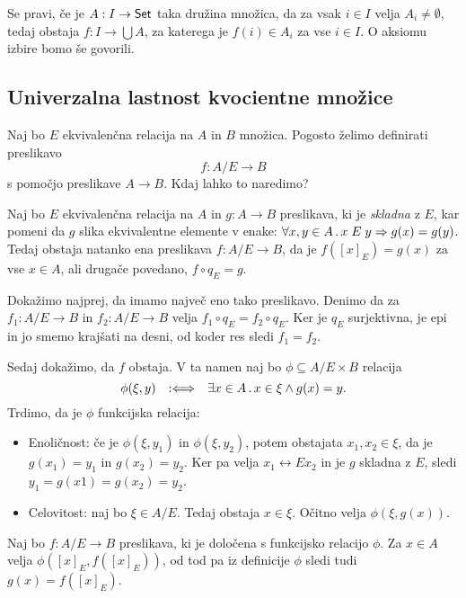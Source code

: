 Se pravi, če je $A : I \to \mathsf{Set}$ taka družina množica, da za vsak $i \in I$ velja $A_i \neq \emptyset$,
tedaj obstaja $f : I \to \bigcup A$, za katerega je $f(i) \in A_i$ za vse $i \in I$.
%
O aksiomu izbire bomo še govorili.


\subsection{Univerzalna lastnost kvocientne množice}

Naj bo $E$ ekvivalenčna relacija na $A$ in $B$ množica. Pogosto želimo definirati
preslikavo
%
\begin{equation*}
    f : A/E \to B
\end{equation*}
%
s pomočjo preslikave $A \to B$. Kdaj lahko to naredimo?

\begin{izrek}
  Naj bo $E$ ekvivalenčna relacija na $A$ in $g : A \to B$ preslikava, ki je \emph{skladna} z $E$, kar pomeni da $g$
  slika ekvivalentne elemente v enake: $\forall x, y \in A \,.\, x \mathrel{E} y \Rightarrow g(x) = g(y)$. Tedaj obstaja natanko ena
  preslikava $f : A/E \to B$, da je $f([x]_E) = g(x)$ za vse $x \in A$, ali drugače povedano, $f \circ q_E = g$.
\end{izrek}

\begin{dokaz}
  Dokažimo najprej, da imamo največ eno tako preslikavo. Denimo da za $f_1 : A/E \to B$ in
  $f_2 : A/E \to B$ velja $f_1 \circ q_E = f_2 \circ q_E$. Ker je $q_E$ surjektivna, je epi in jo smemo
  krajšati na desni, od koder res sledi $f_1 = f_2$.

  Sedaj dokažimo, da $f$ obstaja. V ta namen naj bo $\phi \subseteq A/E \times B$ relacija
  \begin{equation*}
    \phi(\xi, y) \quad {{:}{\Longleftrightarrow}}\quad \exists x \in A \,.\, x \in \xi \land g(x) = y.
  \end{equation*}
  Trdimo, da je $\phi$ funkcijska relacija:
  \begin{itemize}
  \item
    Enoličnost: če je $\phi(\xi, y_1)$ in $\phi(\xi, y_2)$, potem obstajata $x_1, x_2 \in \xi$, da je $g(x_1) = y_1$
    in $g(x_2) = y_2$. Ker pa velja $x_1 \rel{E} x_2$ in je $g$ skladna z $E$, sledi $y_1 = g(x1) = g(x_2) = y_2$.

  \item  Celovitost: naj bo $\xi \in A/E$. Tedaj obstaja $x \in \xi$. Očitno velja $\phi(\xi, g(x))$.
  \end{itemize}
  Naj bo $f : A/E \to B$ preslikava, ki je določena s funkcijsko relacijo $\phi$. Za $x \in A$
  velja $\phi([x]_E, f([x]_E))$, od tod pa iz definicije $\phi$ sledi tudi $g(x) = f([x]_E)$.
\end{dokaz}

